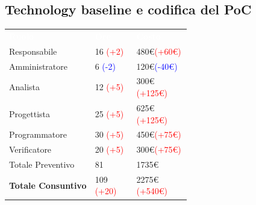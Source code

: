 \subsection{Technology baseline e codifica del PoC}
{\renewcommand{\arraystretch}{2.0}
    \begin{center}
        \begin{tabular}{P{0.25\linewidth}P{0.15\linewidth}P{0.20\linewidth}}
            \textcolor{white}{\textbf{Ruolo}} & \textcolor{white}{\textbf{Ore}} & \textcolor{white}{\textbf{Costo}}\\
            Responsabile & 16 \textcolor{red}{(+2)} & 480\euro \space \textcolor{red}{(+60\euro)}\\
                
            Amministratore & 6 \textcolor{blue}{(-2)} & 120\euro \space \textcolor{blue}{(-40\euro)} \\
    
            Analista & 12 \textcolor{red}{(+5)} & 300\euro \space \textcolor{red}{(+125\euro)}\\
    
            Progettista & 25 \textcolor{red}{(+5)} & 625\euro \space \textcolor{red}{(+125\euro)}\\
    
            Programmatore & 30 \textcolor{red}{(+5)} & 450\euro \space \textcolor{red}{(+75\euro)}\\
    
            Verificatore & 20 \textcolor{red}{(+5)} & 300\euro \space \textcolor{red}{(+75\euro)}\\
    
            \hline\hline
    
            Totale Preventivo & 81 & 1735\euro\\
    
            \textbf{Totale Consuntivo} & 109 \textcolor{red}{(+20)} & 2275\euro \space \textcolor{red}{(+540\euro)}\\
        \end{tabular}
    \end{center}    
}
